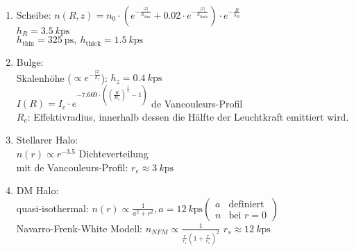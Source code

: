 \begin{enumerate}[label={$\arabic*.$}]
	\item Scheibe: $n(R,z)=n_0\cdot\left(e^{-\frac{|z|}{h_\text{thin}}}+\num{0.02}\cdot e^{-\frac{|z|}{h_\text{thick}}}\right)\cdot e^{-\frac{R}{h_R}}$\\
		$h_R=\SI{3.5}{k\ps}$\\
		$h_\text{thin}=\SI{325}{\ps},\ h_\text{thick}=\SI{1.5}{k\ps}$
	\item Bulge:\\
		Skalenhöhe ($\propto e^{-\frac{|z|}{h_z}}$): $h_z=\SI{0.4}{k\ps}$\\
		$I(R)=I_e\cdot e^{-\num{7.669}\cdot\left(\left(\frac{R}{R_e}\right)^\frac{1}{4}-1\right)}$ de Vancouleurs-Profil\\
		$R_e$: Effektivradius, innerhalb dessen die Hälfte der Leuchtkraft emittiert wird.
	\item Stellarer Halo:\\
		$n(r)\propto r^{-\num{3.5}}$ Dichteverteilung\\
		mit de Vancouleurs-Profil: $r_e\approx \SI{3}{k\ps}$
	\item DM Halo: \\
		quasi-isothermal: $n(r)\propto\frac{1}{a^2+r^2},a=\SI{12}{k\ps} \begin{pmatrix} a & \text{definiert} \\ n & \text{bei $r=0$}\end{pmatrix}$\\
		Navarro-Frenk-White Modell: $n_{NFM}\propto\frac{1}{\frac{r}{r_s}\left(1+\frac{r}{r_s}\right)^2}$ $r_s\approx\SI{12}{k\ps}$
\end{enumerate}
